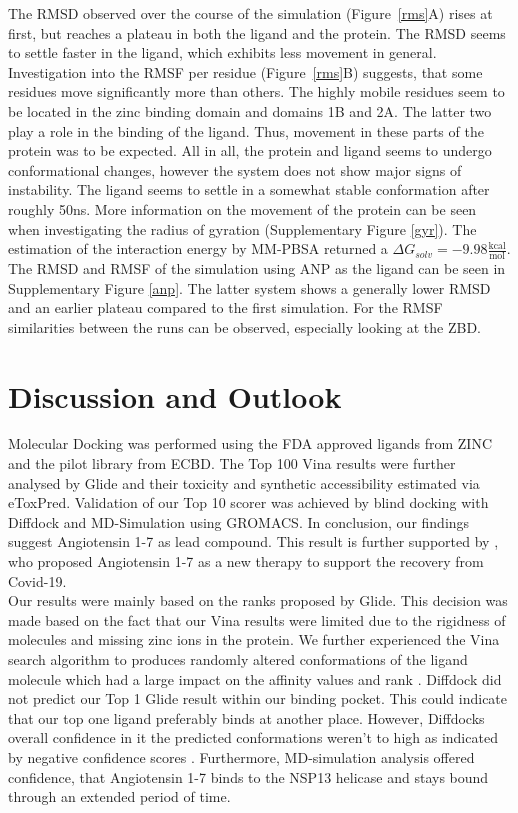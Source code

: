 \documentclass[11pt, letterpaper, titlepage]{article}
\renewcommand{\cite}{\parencite}
\begin{document}
The \ac{RMSD} observed over the course of the simulation (Figure~\ref{rms}A) rises at first, but reaches a plateau in both the ligand and the protein. The RMSD seems to settle faster in the ligand, which exhibits less movement in general. Investigation into the RMSF per residue (Figure~\ref{rms}B) suggests, that some residues move significantly more than others. The highly mobile residues seem to be located in the zinc binding domain and domains 1B and 2A. The latter two play a role in the binding of the ligand. Thus, movement in these parts of the protein was to be expected. All in all, the protein and ligand seems to undergo conformational changes, however the system does not show major signs of instability. The ligand seems to settle in a somewhat stable conformation after roughly 50ns. More information on the movement of the protein can be seen when investigating the radius of gyration (Supplementary Figure \ref{gyr}). The estimation of the interaction energy by \ac{MM-PBSA} returned a $\Delta G_{solv} = -9.98 \frac{\textrm{kcal}}{\textrm{mol}}$. The RMSD and RMSF of the simulation using ANP as the ligand can be seen in Supplementary Figure \ref{anp}. The latter system shows a generally lower RMSD and an earlier plateau compared to the first simulation. For the RMSF similarities between the runs can be observed, especially looking at the ZBD. 

\FloatBarrier

\section{Discussion and Outlook}
Molecular Docking was performed using the FDA approved ligands from ZINC and the pilot library from ECBD. The Top 100 Vina results were further analysed by Glide and their toxicity and synthetic accessibility estimated via eToxPred. Validation of our Top 10 scorer was achieved by blind docking with Diffdock and MD-Simulation using GROMACS. In conclusion, our findings suggest Angiotensin 1-7 as lead compound. This result is further supported by \textcite{angio}, who proposed Angiotensin 1-7 as a new therapy to support the recovery from Covid-19.\\
Our results were mainly based on the ranks proposed by Glide. This decision was made based on the fact that our Vina results were limited due to the rigidness of molecules and missing zinc ions in the protein. We further experienced the Vina search algorithm to produces randomly altered conformations of the ligand molecule which had a large impact on the affinity values and rank \cite{Zev201}. Diffdock did not predict our Top 1 Glide result within our binding pocket. This could indicate that our top one ligand preferably binds at another place. However, Diffdocks overall confidence in it the predicted conformations weren't to high as indicated by negative confidence scores \cite{Corso.2022}. Furthermore, MD-simulation analysis offered confidence, that Angiotensin 1-7 binds to the NSP13 helicase and stays bound through an extended period of time.\\
\end{document}
